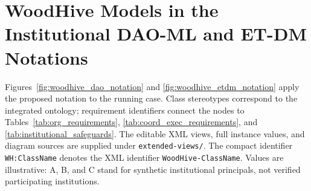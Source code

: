 \documentclass[journal]{IEEEtran}
\begin{document}
\section{WoodHive Models in the Institutional DAO-ML and ET-DM Notations}
\label{app:woodhive_models}

Figures~\ref{fig:woodhive_dao_notation} and
\ref{fig:woodhive_etdm_notation} apply the proposed notation
to the running case. Class stereotypes correspond to the
integrated ontology; requirement identifiers connect the
nodes to Tables~\ref{tab:org_requirements},
\ref{tab:coord_exec_requirements}, and
\ref{tab:institutional_safeguards}. The editable XML views,
full instance values, and diagram sources are supplied under
\texttt{extended-views/}. The compact identifier \texttt{WH:ClassName} denotes the XML
identifier \texttt{WoodHive-ClassName}. Values are illustrative: A, B, and C
stand for synthetic institutional principals, not verified
participating institutions.
\end{document}
